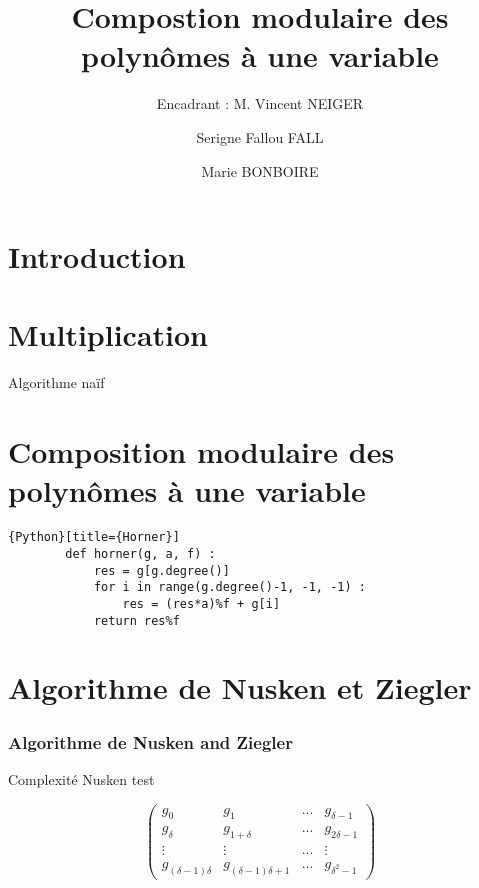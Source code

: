 \documentclass[a4paper]{beamer}
\title[Center text]{\textbf{Compostion modulaire des polynômes à une variable}}
\subtitle{\small{Encadrant : M. Vincent NEIGER}}
\author{Serigne Fallou FALL \and Marie BONBOIRE}
\date{}
\begin{document}
\begin{frame}
    \titlepage
\end{frame}


\section{Introduction}
\begin{frame}
    \tableofcontents[currentsection]
\end{frame}

\section{Multiplication}
\begin{frame}
    \tableofcontents[currentsection]
\end{frame}

\begin{frame}{Algorithme naïf}
    

\end{frame}


\section{Composition modulaire des polynômes à une variable}
\begin{frame}
    \tableofcontents[currentsection]
\end{frame}

\begin{frame}[fragile]
    \begin{lstlisting}{Python}[title={Horner}]
        def horner(g, a, f) :
            res = g[g.degree()]
            for i in range(g.degree()-1, -1, -1) :
                res = (res*a)%f + g[i]
            return res%f
        \end{lstlisting}
\end{frame}

\section{Algorithme de Nusken et Ziegler}
\begin{frame}
    \tableofcontents[currentsection]
\end{frame}

\begin{frame}
    \frametitle{Algorithme de Nusken and Ziegler}
    \begin{alertblock}{Complexité Nusken}
        test
    \end{alertblock}
    \[
    \begin{pmatrix}
        g_0&g_1&...&g_{\delta -1} \\
        g_{\delta}&g_{1+\delta}&...&g_{2\delta-1} \\
        \vdots&\vdots&...&\vdots \\
        g_{(\delta-1)\delta}&g_{(\delta-1)\delta+1}&...&g_{\delta^2-1}
    
    \end{pmatrix}
    \]


\end{frame}
\end{document}
